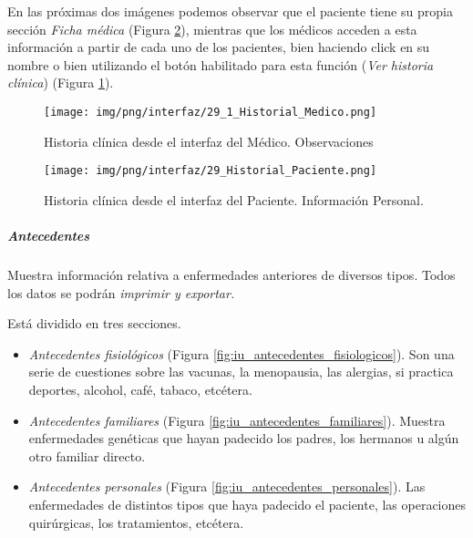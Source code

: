 \documentclass[a4paper,oneside,11pt]{book}
\begin{document}
		En las próximas dos imágenes podemos observar que el paciente tiene su propia sección \textit{Ficha médica} (Figura \ref{fig:iu_hc_paciente}), mientras que los médicos acceden a esta información a partir de cada uno de los pacientes, bien haciendo click en su nombre o bien utilizando el botón habilitado para esta función (\textit{Ver historia clínica}) (Figura \ref{fig:iu_hc_medico}).
		
		\begin{figure}[H]
		  \centering
		    \texttt{[image: img/png/interfaz/29\_1\_Historial\_Medico.png]}
		  \caption{Historia clínica desde el interfaz del Médico. Observaciones}
		  \label{fig:iu_hc_medico}
		\end{figure}
		
		\begin{figure}[H]
		  \centering
		    \texttt{[image: img/png/interfaz/29\_Historial\_Paciente.png]}
		  \caption{Historia clínica desde el interfaz del Paciente. Información Personal.}
		  \label{fig:iu_hc_paciente}
		\end{figure}
		
		\subparagraph{Antecedentes} %
		\label{par:antecedentes}
		
			Muestra información relativa a enfermedades anteriores de diversos tipos. Todos los datos se podrán \textit{imprimir y exportar.}
			
			Está dividido en tres secciones.
			
			\begin{itemize}
				\item \textit{Antecedentes fisiológicos} (Figura \ref{fig:iu_antecedentes_fisiologicos}). Son una serie de cuestiones sobre las vacunas, la menopausia, las alergias, si practica deportes, alcohol, café, tabaco, etcétera.
				\item \textit{Antecedentes familiares} (Figura \ref{fig:iu_antecedentes_familiares}). Muestra enfermedades genéticas que hayan padecido los padres, los hermanos u algún otro familiar directo. 
				
				\item \textit{Antecedentes personales} (Figura \ref{fig:iu_antecedentes_personales}). Las enfermedades de distintos tipos que haya padecido el paciente, las operaciones quirúrgicas, los tratamientos, etcétera. 
			\end{itemize}
			
			
\end{document}
